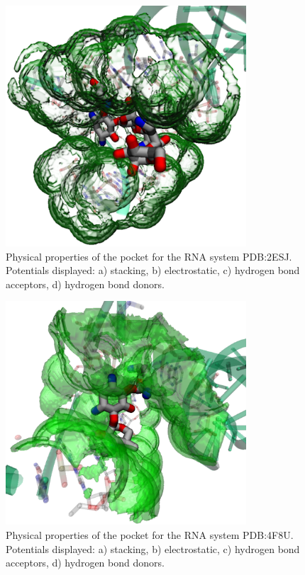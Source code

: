     \begin{figure}[H]
      \centering
      \includegraphics[width=0.8\textwidth]{figures/results/benchmark_rna/2esj.png}
      \caption{\label{fig:benchmark/2esj} Physical properties of the pocket for the RNA system PDB:2ESJ. Potentials displayed: a) stacking, b) electrostatic, c) hydrogen bond acceptors, d) hydrogen bond donors.}
    \end{figure}

    \begin{figure}[H]
      \centering
      \includegraphics[width=0.8\textwidth]{figures/results/benchmark_rna/4f8u.png}
      \caption{\label{fig:benchmark/4f8u} Physical properties of the pocket for the RNA system PDB:4F8U. Potentials displayed: a) stacking, b) electrostatic, c) hydrogen bond acceptors, d) hydrogen bond donors.}
    \end{figure}

